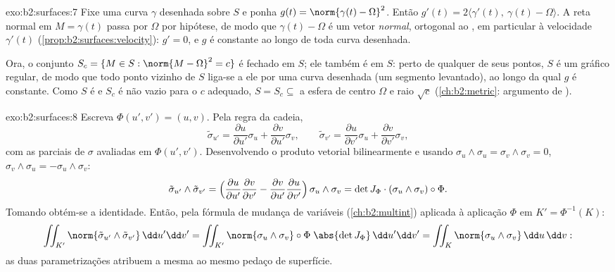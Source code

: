 \begin{solution}{exo:b2:surfaces:7}
Fixe uma curva $\gamma$ desenhada sobre $S$ e ponha $g(t) = \norm{\gamma(t)
- \Omega}^2$. Então $g'(t) = 2\langle \gamma'(t),\ \gamma(t) -
\Omega\rangle$. A reta normal em $M = \gamma(t)$ passa por
$\Omega$ por hipótese, de modo que $\gamma(t) - \Omega$ é um vetor
\emph{normal}, ortogonal ao , em particular à
velocidade $\gamma'(t)$ (\cref{prop:b2:surfaces:velocity}): $g' =
0$, e $g$ é constante ao longo de toda curva desenhada.

Ora, o conjunto $S_c = \{M \in S : \norm{M - \Omega}^2 = c\}$ é
fechado em $S$; ele também é  em $S$: perto de qualquer de seus pontos, $S$
é um gráfico regular, de modo que todo ponto vizinho de $S$ liga-se a ele por
uma curva desenhada (um segmento levantado), ao longo da qual $g$ é constante. Como
$S$ é  e $S_c$ é não vazio para o $c$ adequado, $S = S_c
\subseteq$ a esfera de centro $\Omega$ e raio $\sqrt c$
(\cref{ch:b2:metric}: argumento de ).
\end{solution}

\begin{solution}{exo:b2:surfaces:8}
Escreva $\Phi(u', v') = (u, v)$. Pela regra da cadeia,
\[
\tilde\sigma_{u'} = \frac{\partial u}{\partial u'}\sigma_u
+ \frac{\partial v}{\partial u'}\sigma_v,
\qquad
\tilde\sigma_{v'} = \frac{\partial u}{\partial v'}\sigma_u
+ \frac{\partial v}{\partial v'}\sigma_v ,
\]
com as parciais de $\sigma$ avaliadas em $\Phi(u',v')$. Desenvolvendo o
produto vetorial bilinearmente e usando $\sigma_u \wedge \sigma_u =
\sigma_v \wedge \sigma_v = 0$, $\sigma_v \wedge \sigma_u =
-\sigma_u \wedge \sigma_v$:
\[
\tilde\sigma_{u'} \wedge \tilde\sigma_{v'}
= \Bigl(\frac{\partial u}{\partial u'}
\frac{\partial v}{\partial v'}
- \frac{\partial v}{\partial u'}
\frac{\partial u}{\partial v'}\Bigr)\,
\sigma_u \wedge \sigma_v
= \det J_\Phi \cdot (\sigma_u \wedge \sigma_v)\circ\Phi .
\]
Tomando  obtém-se a identidade. Então, pela fórmula de
mudança de variáveis (\cref{ch:b2:multint}) aplicada à aplicação $\Phi$ em $K' =
\Phi^{-1}(K)$:
\[
\iint_{K'} \norm{\tilde\sigma_{u'} \wedge \tilde\sigma_{v'}}
\,\dd u'\dd v'
= \iint_{K'} \norm{\sigma_u \wedge \sigma_v}\circ\Phi\;
\abs{\det J_\Phi}\,\dd u'\dd v'
= \iint_K \norm{\sigma_u \wedge \sigma_v}\,\dd u\,\dd v :
\]
as duas parametrizações atribuem a mesma  ao mesmo pedaço de
superfície.
\end{solution}

